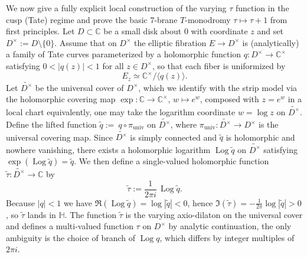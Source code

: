\documentclass[11pt]{article}
\DeclareMathOperator{\Log}{Log}
\theoremstyle{remark}
\begin{document}
We now give a fully explicit local construction of the varying $\tau$ function in the cusp (Tate) regime and prove the basic 7-brane $T$-monodromy $\tau\mapsto\tau+1$ from first principles. Let $D\subset\mathbb{C}$ be a small disk about $0$ with coordinate $z$ and set $D^\times:=D\setminus\{0\}$. Assume that on $D^\times$ the elliptic fibration $E\to D^\times$ is (analytically) a family of Tate curves parameterized by a holomorphic function $q:D^\times\to\mathbb{C}^\times$ satisfying $0<|q(z)|<1$ for all $z\in D^\times$, so that each fiber is uniformized by
\begin{equation}\label{eq:tate_uniformization}
E_z\simeq \mathbb{C}^\times/\langle q(z)\rangle.
\end{equation}
Let $\widetilde{D^\times}$ be the universal cover of $D^\times$, which we identify with the strip model via the holomorphic covering map $\exp:\mathbb{C}\to\mathbb{C}^\times$, $w\mapsto e^w$, composed with $z=e^w$ in a local chart equivalently, one may take the logarithm coordinate $w=\log z$ on $\widetilde{D^\times}$. Define the lifted function $\widetilde{q}:=\ q\circ \pi_{\mathrm{univ}}$ on $\widetilde{D^\times}$, where $\pi_{\mathrm{univ}}:\widetilde{D^\times}\to D^\times$ is the universal covering map. Since $\widetilde{D^\times}$ is simply connected and $\widetilde{q}$ is holomorphic and nowhere vanishing, there exists a holomorphic logarithm $\Log\widetilde{q}$ on $\widetilde{D^\times}$ satisfying $\exp(\Log\widetilde{q})=\widetilde{q}$. We then define a single-valued holomorphic function $\widetilde{\tau}:\widetilde{D^\times}\to\mathbb{C}$ by
\begin{equation}\label{eq:tau_from_q}
\widetilde{\tau}:=\frac{1}{2\pi i}\,\Log\widetilde{q}.
\end{equation}
Because $|q|<1$ we have $\Re(\Log\widetilde{q})=\log|\widetilde{q}|<0$, hence $\Im(\widetilde{\tau})=-\frac{1}{2\pi}\log|\widetilde{q}|>0$, so $\widetilde{\tau}$ lands in $\mathbb{H}$. The function $\widetilde{\tau}$ is the varying axio-dilaton on the universal cover and defines a multi-valued function $\tau$ on $D^\times$ by analytic continuation, the only ambiguity is the choice of branch of $\Log q$, which differs by integer multiples of $2\pi i$.
\end{document}
